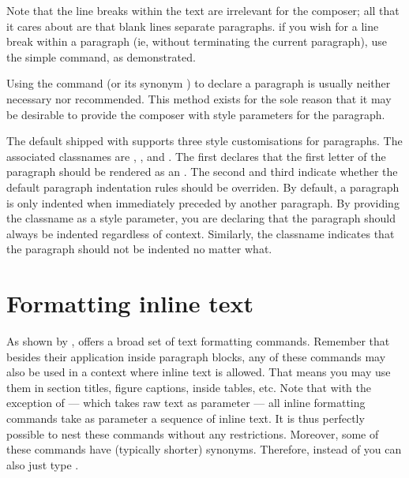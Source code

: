 Note that the line breaks within the text are irrelevant for the composer; all that
it cares about are that blank lines separate paragraphs.  if you wish for a line break
within a paragraph (ie, without terminating the current paragraph), use the \mono{\\br}
simple command, as demonstrated.

Using the command \mono{\\paragraph} (or its synonym \mono{\\p}) to declare a
paragraph is usually neither necessary nor recommended.  This method exists for the
sole reason that it may be desirable to provide the composer with style parameters
for the paragraph. 

The default  shipped with \lambdoc supports three style customisations
for paragraphs.  The associated classnames are , ,
and .  The first declares that the first letter of the paragraph
should be rendered as an .
The second and third indicate whether the default paragraph indentation rules should
be overriden.  By default, a paragraph is only indented when immediately preceded by
another paragraph.  By providing the  classname as a style parameter,
you are declaring that the paragraph should always be indented regardless of context.
Similarly, the  classname indicates that the paragraph should not be
indented no matter what.


\section[sec:inline]{Formatting inline text}

As shown by , \lambtex offers a broad set of text formatting commands.
Remember that besides their application inside paragraph blocks, any of these commands
may also be used in a context where inline text is allowed.  That means you may use
them in section titles, figure captions, inside tables, etc.  Note that with the
exception of \mono{\\code} --- which takes raw text as parameter --- all inline formatting
commands take as parameter a sequence of inline text.  It is thus perfectly possible to
nest these commands without any restrictions.  Moreover, some of these commands have
(typically shorter) synonyms.  Therefore, instead of \mono{\\bold} you can also just
type \mono{\\b}.

